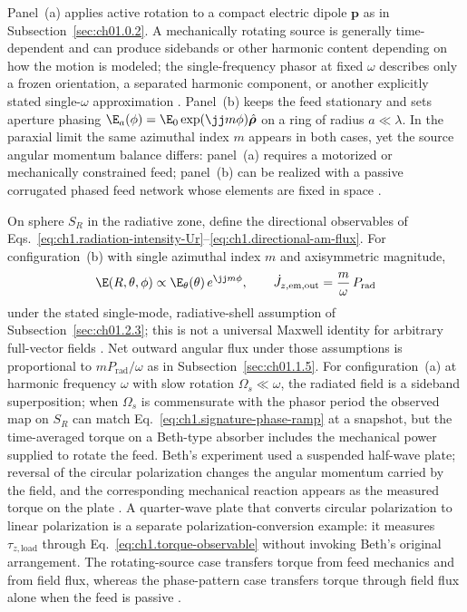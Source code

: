 Panel~(a) applies active rotation to a compact electric dipole \(\mathbf{p}\) as in Subsection~\ref{sec:ch01.0.2}. A mechanically rotating source is generally time-dependent and can produce sidebands or other harmonic content depending on how the motion is modeled; the single-frequency phasor at fixed \(\omega\) describes only a frozen orientation, a separated harmonic component, or another explicitly stated single-$\omega$ approximation \cite{stratton1941}.
Panel~(b) keeps the feed stationary and sets aperture phasing
\(\E_a(\phi)=\E_0\exp(\jj m\phi)\hat{\boldsymbol{\rho}}\) on a ring of radius
\(a\ll\lambda\). In the paraxial limit the same azimuthal index \(m\) appears in
both cases, yet the source angular momentum balance differs: panel~(a) requires a
motorized or mechanically constrained feed; panel~(b) can be realized with a passive
corrugated phased feed network whose elements are fixed in space \cite{harrington2001}.

On sphere \(S_R\) in the radiative zone, define the directional observables of
Eqs.~\eqref{eq:ch1.radiation-intensity-Ur}--\eqref{eq:ch1.directional-am-flux}.
For configuration~(b) with single azimuthal index \(m\) and axisymmetric magnitude,
\begin{equation}
\label{eq:ch1.signature-phase-ramp}
\E(R,\theta,\phi)\propto \E_\theta(\theta)\,e^{\jj m\phi},
\qquad
\dot J_{z,\mathrm{em,out}}=\frac{m}{\omega}\,P_{\mathrm{rad}}
\end{equation}
under the stated single-mode, radiative-shell assumption of Subsection~\ref{sec:ch01.2.3}; this is not a universal Maxwell identity for arbitrary full-vector fields \cite{stratton1941,allen1992}. Net outward angular flux under those assumptions is proportional to \(m P_{\mathrm{rad}}/\omega\) as in
Subsection~\ref{sec:ch01.1.5}. For configuration~(a) at harmonic frequency
\(\omega\) with slow rotation \(\Omega_s\ll\omega\), the radiated field is a
sideband superposition; when \(\Omega_s\) is commensurate with the phasor period the
observed map on \(S_R\) can match Eq.~\eqref{eq:ch1.signature-phase-ramp} at a
snapshot, but the time-averaged torque on a Beth-type absorber includes the
mechanical power supplied to rotate the feed. Beth's experiment used a suspended half-wave plate; reversal of the circular polarization changes the angular momentum carried by the field, and the corresponding mechanical reaction appears as the measured torque on the plate \cite{beth1936}. A quarter-wave plate that converts circular polarization to linear polarization is a separate polarization-conversion example: it measures \(\tau_{z,\mathrm{load}}\) through Eq.~\eqref{eq:ch1.torque-observable} without invoking Beth's original arrangement. The rotating-source case transfers torque from feed mechanics and from field flux, whereas the phase-pattern case transfers torque through field flux alone when the feed is passive \cite{stratton1941}.

